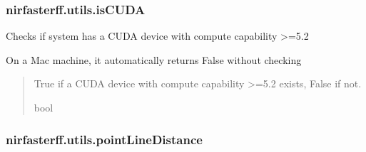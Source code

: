 \documentclass[letterpaper,10pt,english]{sphinxmanual}
\begin{document}
\sphinxstepscope


\subsubsection{nirfasterff.utils.isCUDA}
\label{\detokenize{_autosummary/nirfasterff.utils.isCUDA:nirfasterff-utils-iscuda}}\label{\detokenize{_autosummary/nirfasterff.utils.isCUDA::doc}}

\begin{fulllineitems}
\label{\detokenize{_autosummary/nirfasterff.utils.isCUDA:nirfasterff.utils.isCUDA}}
\pysigstartsignatures
{}
\pysigstopsignatures
\sphinxAtStartPar
Checks if system has a CUDA device with compute capability \textgreater{}=5.2

\sphinxAtStartPar
On a Mac machine, it automatically returns False without checking
\begin{quote}\begin{description}
\sphinxAtStartPar
True if a CUDA device with compute capability \textgreater{}=5.2 exists, False if not.

\sphinxAtStartPar
bool

\end{description}\end{quote}

\end{fulllineitems}


\sphinxstepscope


\subsubsection{nirfasterff.utils.pointLineDistance}
\label{\detokenize{_autosummary/nirfasterff.utils.pointLineDistance:nirfasterff-utils-pointlinedistance}}\label{\detokenize{_autosummary/nirfasterff.utils.pointLineDistance::doc}}
\end{document}
